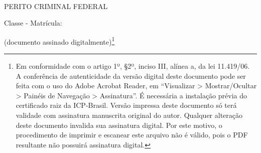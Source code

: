 \bigskip
\begin{center}
	~\bigskip

	\textbf{\MakeUppercase{\pfauthor}}
	
	PERITO CRIMINAL FEDERAL
	
	Classe \pfauthorclass\space - Matrícula: \pfauthormatr

	(documento assinado digitalmente)\footnote{%
		Em conformidade com o artigo 1º, \S 2º, inciso III, alínea a, da lei 11.419/06.
		A conferência de autenticidade da versão digital deste documento pode ser feita com o uso do Adobe Acrobat Reader, em ``Visualizar > Mostrar/Ocultar > Painéis de Navegação > Assinatura''. É necessária a instalação prévia do certificado raiz da ICP-Brasil.
		Versão impressa deste documento só terá validade com assinatura manuscrita original do autor.
		Qualquer alteração deste documento invalida sua assinatura digital. Por este motivo, o procedimento de imprimir e escanear este arquivo não é válido, pois o PDF resultante não possuirá assinatura digital.
	}
\end{center}
